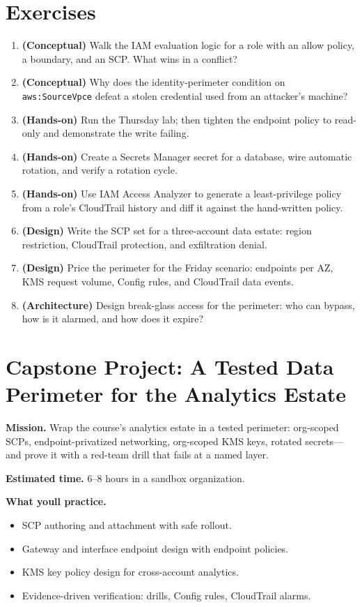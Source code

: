 \section{Exercises}
\begin{enumerate}
    \item \textbf{(Conceptual)} Walk the IAM evaluation logic for a role with an allow policy, a boundary, and an SCP. What wins in a conflict?
    \item \textbf{(Conceptual)} Why does the identity-perimeter condition on \texttt{aws:SourceVpce} defeat a stolen credential used from an attacker's machine?
    \item \textbf{(Hands-on)} Run the Thursday lab; then tighten the endpoint policy to read-only and demonstrate the write failing.
    \item \textbf{(Hands-on)} Create a Secrets Manager secret for a database, wire automatic rotation, and verify a rotation cycle.
    \item \textbf{(Hands-on)} Use IAM Access Analyzer to generate a least-privilege policy from a role's CloudTrail history and diff it against the hand-written policy.
    \item \textbf{(Design)} Write the SCP set for a three-account data estate: region restriction, CloudTrail protection, and exfiltration denial.
    \item \textbf{(Design)} Price the perimeter for the Friday scenario: endpoints per AZ, KMS request volume, Config rules, and CloudTrail data events.
    \item \textbf{(Architecture)} Design break-glass access for the perimeter: who can bypass, how is it alarmed, and how does it expire?
\end{enumerate}

\section{Capstone Project: A Tested Data Perimeter for the Analytics Estate}\label{sec:ch21-capstone}

\begin{capstonebox}
\textbf{Mission.} Wrap the course's analytics estate in a tested perimeter: org-scoped SCPs, endpoint-privatized networking, org-scoped KMS keys, rotated secrets---and prove it with a red-team drill that fails at a named layer.

\textbf{Estimated time.} 6--8 hours in a sandbox organization.

\textbf{What you\textquotesingle{}ll practice.}
\begin{itemize}
    \item SCP authoring and attachment with safe rollout.
    \item Gateway and interface endpoint design with endpoint policies.
    \item KMS key policy design for cross-account analytics.
    \item Evidence-driven verification: drills, Config rules, CloudTrail alarms.
\end{itemize}
\end{capstonebox}

